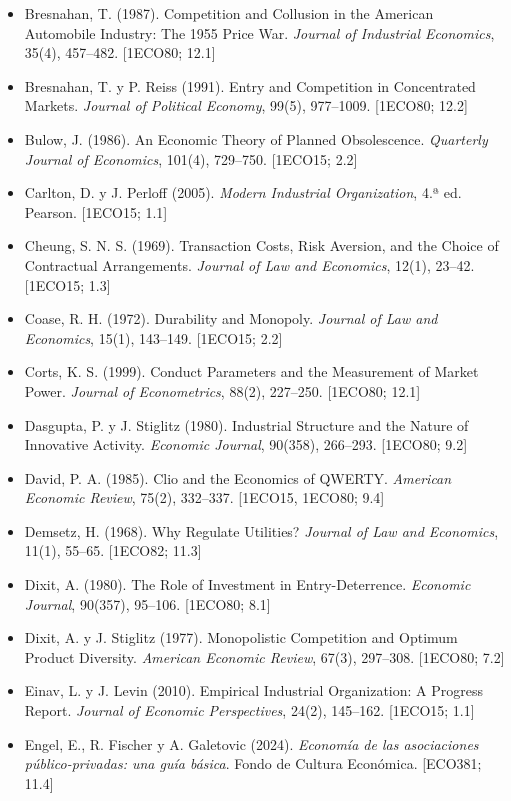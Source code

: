 \documentclass[11pt,a4paper]{article}
\begin{document}
{\begin{itemize}[leftmargin=1.4em,itemsep=1pt,label={}]
\item Bresnahan, T. (1987). Competition and Collusion in the American Automobile Industry: The 1955 Price War. \emph{Journal of Industrial Economics}, 35(4), 457--482. [1ECO80; 12.1]
\item Bresnahan, T. y P. Reiss (1991). Entry and Competition in Concentrated Markets. \emph{Journal of Political Economy}, 99(5), 977--1009. [1ECO80; 12.2]
\item Bulow, J. (1986). An Economic Theory of Planned Obsolescence. \emph{Quarterly Journal of Economics}, 101(4), 729--750. [1ECO15; 2.2]
\item Carlton, D. y J. Perloff (2005). \emph{Modern Industrial Organization}, 4.ª ed. Pearson. [1ECO15; 1.1]
\item Cheung, S. N. S. (1969). Transaction Costs, Risk Aversion, and the Choice of Contractual Arrangements. \emph{Journal of Law and Economics}, 12(1), 23--42. [1ECO15; 1.3]
\item Coase, R. H. (1972). Durability and Monopoly. \emph{Journal of Law and Economics}, 15(1), 143--149. [1ECO15; 2.2]
\item Corts, K. S. (1999). Conduct Parameters and the Measurement of Market Power. \emph{Journal of Econometrics}, 88(2), 227--250. [1ECO80; 12.1]
\item Dasgupta, P. y J. Stiglitz (1980). Industrial Structure and the Nature of Innovative Activity. \emph{Economic Journal}, 90(358), 266--293. [1ECO80; 9.2]
\item David, P. A. (1985). Clio and the Economics of QWERTY. \emph{American Economic Review}, 75(2), 332--337. [1ECO15, 1ECO80; 9.4]
\item Demsetz, H. (1968). Why Regulate Utilities? \emph{Journal of Law and Economics}, 11(1), 55--65. [1ECO82; 11.3]
\item Dixit, A. (1980). The Role of Investment in Entry-Deterrence. \emph{Economic Journal}, 90(357), 95--106. [1ECO80; 8.1]
\item Dixit, A. y J. Stiglitz (1977). Monopolistic Competition and Optimum Product Diversity. \emph{American Economic Review}, 67(3), 297--308. [1ECO80; 7.2]
\item Einav, L. y J. Levin (2010). Empirical Industrial Organization: A Progress Report. \emph{Journal of Economic Perspectives}, 24(2), 145--162. [1ECO15; 1.1]
\item Engel, E., R. Fischer y A. Galetovic (2024). \emph{Economía de las asociaciones público-privadas: una guía básica}. Fondo de Cultura Económica. [ECO381; 11.4]

\end{itemize}}
\end{document}
